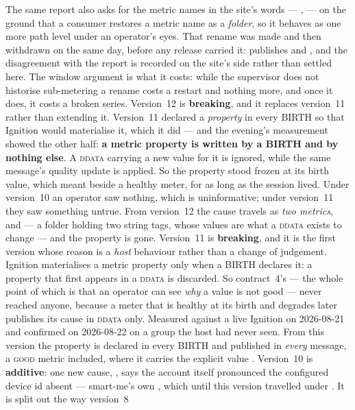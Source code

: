 The same report also asks for the metric names in the site's words --- ,
 --- on the ground that a consumer restores a metric name as a \emph{folder}, so it
behaves as one more path level under an operator's eyes. That rename was made and then withdrawn on
the same day, before any release carried it: \prog{} publishes  and , and
the disagreement with the report is recorded on the site's side rather than settled here. The window
argument is what it costs: while the supervisor does not historise sub-metering a rename costs a
restart and nothing more, and once it does, it costs a broken series.
Version~12
is \textbf{breaking}, and it replaces version~11 rather than extending it. Version~11 declared a
 \emph{property} in every BIRTH so that Ignition would materialise it, which it did
--- and the evening's measurement showed the other half: \textbf{a metric property is written by
a BIRTH and by nothing else}. A \textsc{ddata} carrying a new value for it is ignored, while the
same message's quality update is applied. So the property stood frozen at its birth value, which
meant  beside a healthy meter, for as long as the session lived. Under
version~10 an operator saw nothing, which is uninformative; under version~11 they saw something
untrue. From version~12 the cause travels as \emph{two metrics},  and
 --- a  folder holding two string tags, whose values are what a
\textsc{ddata} exists to change --- and the property is gone. Version~11
is \textbf{breaking}, and it is the first version whose reason is a \emph{host} behaviour rather
than a change of judgement. Ignition materialises a metric property only when a BIRTH declares
it: a property that first appears in a \textsc{ddata} is discarded. So contract~4's 
--- the whole point of which is that an operator can see \emph{why} a value is not good --- never
reached anyone, because a meter that is healthy at its birth and degrades later publishes its
cause in \textsc{ddata} only. Measured against a live Ignition on 2026-08-21 and confirmed on
2026-08-22 on a group the host had never seen. From this version the property is declared in
every BIRTH and published in \emph{every} message, a \textsc{good} metric included, where it
carries the explicit value . Version~10
is \textbf{additive}: one new cause, , says the account itself
pronounced the configured device id absent --- smart-me's own , which until this
version travelled under . It is split out the way version~8
